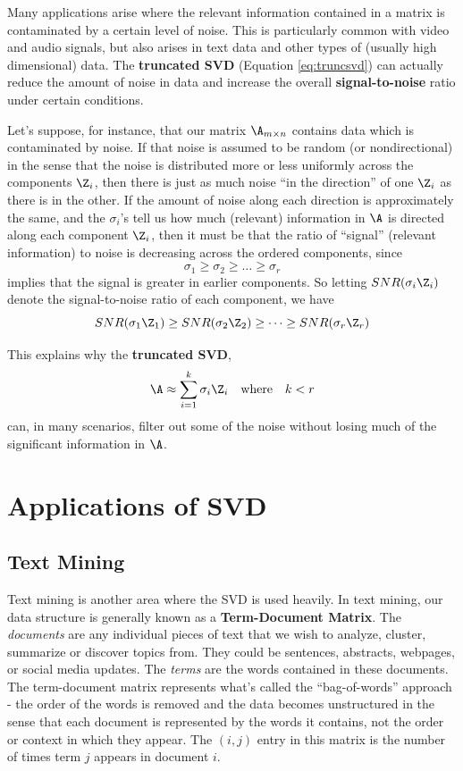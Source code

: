\documentclass[
]{article}
\theoremstyle{definition}
\theoremstyle{definition}
\theoremstyle{definition}
\theoremstyle{definition}
\theoremstyle{remark}
\begin{document}
Many applications arise where the relevant information contained in a matrix is contaminated by a certain level of noise. This is particularly common with video and audio signals, but also arises in text data and other types of (usually high dimensional) data. The \textbf{truncated SVD} (Equation \eqref{eq:truncsvd}) can actually reduce the amount of noise in data and increase the overall \textbf{signal-to-noise} ratio under certain conditions.

Let's suppose, for instance, that our matrix \(\A_{m\times n}\) contains data which is contaminated by noise. If that noise is assumed to be random (or nondirectional) in the sense that the noise is distributed more or less uniformly across the components \(\Z_i\), then there is just as much noise ``in the direction'' of one \(\Z_i\) as there is in the other. If the amount of noise along each direction is approximately the same, and the \(\sigma_i\)'s tell us how much (relevant) information in \(\A\) is directed along each component \(\Z_i\), then it must be that the ratio of ``signal'' (relevant information) to noise is decreasing across the ordered components, since
\[\sigma_1 \geq \sigma_2\geq \dots \geq \sigma_r\]
implies that the signal is greater in earlier components. So letting \(SNR(\sigma_i\Z_i)\) denote the signal-to-noise ratio of each component, we have
\[SNR(\sigma_1\Z_1) \geq SNR(\sigma_2\Z_2)\geq \dots \geq SNR(\sigma_r\Z_r)\]

This explains why the \textbf{truncated SVD},
\[\A \approx \sum_{i=1}^{k} \sigma_i \Z_i \quad \mbox{where}\quad k<r\]
can, in many scenarios, filter out some of the noise without losing much of the significant information in \(\A\).

\hypertarget{svdapp}{%
\section{Applications of SVD}\label{svdapp}}

\hypertarget{tm}{%
\subsection{Text Mining}\label{tm}}

Text mining is another area where the SVD is used heavily. In text mining, our data structure is generally known as a \textbf{Term-Document Matrix}. The \emph{documents} are any individual pieces of text that we wish to analyze, cluster, summarize or discover topics from. They could be sentences, abstracts, webpages, or social media updates. The \emph{terms} are the words contained in these documents. The term-document matrix represents what's called the ``bag-of-words'' approach - the order of the words is removed and the data becomes unstructured in the sense that each document is represented by the words it contains, not the order or context in which they appear. The \((i,j)\) entry in this matrix is the number of times term \(j\) appears in document \(i\).
\end{document}
